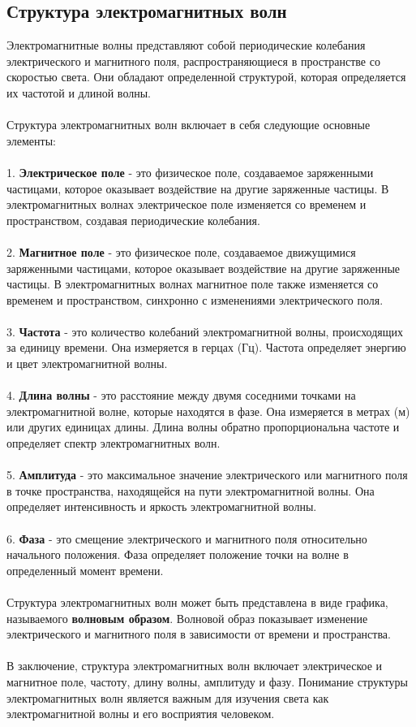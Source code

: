 \documentclass{article}
\begin{document}
\subsection{Структура электромагнитных волн}
Электромагнитные волны представляют собой периодические колебания электрического и магнитного поля, распространяющиеся в пространстве со скоростью света. Они обладают определенной структурой, которая определяется их частотой и длиной волны.\\
~\\
Структура электромагнитных волн включает в себя следующие основные элементы:\\
~\\
1. \textbf{Электрическое поле} - это физическое поле, создаваемое заряженными частицами, которое оказывает воздействие на другие заряженные частицы. В электромагнитных волнах электрическое поле изменяется со временем и пространством, создавая периодические колебания.\\
~\\
2. \textbf{Магнитное поле} - это физическое поле, создаваемое движущимися заряженными частицами, которое оказывает воздействие на другие заряженные частицы. В электромагнитных волнах магнитное поле также изменяется со временем и пространством, синхронно с изменениями электрического поля.\\
~\\
3. \textbf{Частота} - это количество колебаний электромагнитной волны, происходящих за единицу времени. Она измеряется в герцах (Гц). Частота определяет энергию и цвет электромагнитной волны.\\
~\\
4. \textbf{Длина волны} - это расстояние между двумя соседними точками на электромагнитной волне, которые находятся в фазе. Она измеряется в метрах (м) или других единицах длины. Длина волны обратно пропорциональна частоте и определяет спектр электромагнитных волн.\\
~\\
5. \textbf{Амплитуда} - это максимальное значение электрического или магнитного поля в точке пространства, находящейся на пути электромагнитной волны. Она определяет интенсивность и яркость электромагнитной волны.\\
~\\
6. \textbf{Фаза} - это смещение электрического и магнитного поля относительно начального положения. Фаза определяет положение точки на волне в определенный момент времени.\\
~\\
Структура электромагнитных волн может быть представлена в виде графика, называемого \textbf{волновым образом}. Волновой образ показывает изменение электрического и магнитного поля в зависимости от времени и пространства.\\
~\\
В заключение, структура электромагнитных волн включает электрическое и магнитное поле, частоту, длину волны, амплитуду и фазу. Понимание структуры электромагнитных волн является важным для изучения света как электромагнитной волны и его восприятия человеком.
\end{document}
